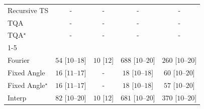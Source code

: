 \begin{tabular}{l|cccc|}
Recursive TS & {\cellcolor[HTML]{000000}} \color[HTML]{F1F1F1} {\cellcolor{white}} \color{black} - & {\cellcolor[HTML]{000000}} \color[HTML]{F1F1F1} {\cellcolor{white}} \color{black} - & {\cellcolor[HTML]{000000}} \color[HTML]{F1F1F1} {\cellcolor{white}} \color{black} - & {\cellcolor[HTML]{000000}} \color[HTML]{F1F1F1} {\cellcolor{white}} \color{black} - \\
TQA & {\cellcolor[HTML]{000000}} \color[HTML]{F1F1F1} {\cellcolor{white}} \color{black} - & {\cellcolor[HTML]{000000}} \color[HTML]{F1F1F1} {\cellcolor{white}} \color{black} - & {\cellcolor[HTML]{000000}} \color[HTML]{F1F1F1} {\cellcolor{white}} \color{black} - & {\cellcolor[HTML]{000000}} \color[HTML]{F1F1F1} {\cellcolor{white}} \color{black} - \\
TQA$^\star$ & {\cellcolor[HTML]{000000}} \color[HTML]{F1F1F1} {\cellcolor{white}} \color{black} - & {\cellcolor[HTML]{000000}} \color[HTML]{F1F1F1} {\cellcolor{white}} \color{black} - & {\cellcolor[HTML]{000000}} \color[HTML]{F1F1F1} {\cellcolor{white}} \color{black} - & {\cellcolor[HTML]{000000}} \color[HTML]{F1F1F1} {\cellcolor{white}} \color{black} - \\
\cline{1-5}
\multicolumn{5}{c}{\rule{0pt}{8pt}SV} \\
\midrule
Fourier & {\cellcolor[HTML]{EEF8EA}} \color[HTML]{000000} $54$ [$10$--$18$] & {\cellcolor[HTML]{F7FCF5}} \color[HTML]{000000} $10$ [$12$] & {\cellcolor[HTML]{00441B}} \color[HTML]{F1F1F1} $688$ [$10$--$20$] & {\cellcolor[HTML]{A3DA9D}} \color[HTML]{000000} $260$ [$10$--$20$] \\
Fixed Angle & {\cellcolor[HTML]{F6FCF4}} \color[HTML]{000000} $16$ [$11$--$17$] & {\cellcolor[HTML]{000000}} \color[HTML]{F1F1F1} {\cellcolor{white}} \color{black} - & {\cellcolor[HTML]{F5FBF3}} \color[HTML]{000000} $18$ [$10$--$18$] & {\cellcolor[HTML]{EDF8E9}} \color[HTML]{000000} $60$ [$10$--$20$] \\
Fixed Angle$^\star$ & {\cellcolor[HTML]{F6FCF4}} \color[HTML]{000000} $16$ [$11$--$17$] & {\cellcolor[HTML]{000000}} \color[HTML]{F1F1F1} {\cellcolor{white}} \color{black} - & {\cellcolor[HTML]{F5FBF3}} \color[HTML]{000000} $18$ [$10$--$18$] & {\cellcolor[HTML]{EDF8EA}} \color[HTML]{000000} $57$ [$10$--$20$] \\
Interp & {\cellcolor[HTML]{E8F6E3}} \color[HTML]{000000} $82$ [$10$--$20$] & {\cellcolor[HTML]{F7FCF5}} \color[HTML]{000000} $10$ [$12$] & {\cellcolor[HTML]{00471C}} \color[HTML]{F1F1F1} $681$ [$10$--$20$] & {\cellcolor[HTML]{68BE70}} \color[HTML]{000000} $370$ [$10$--$20$] \\

\end{tabular}
